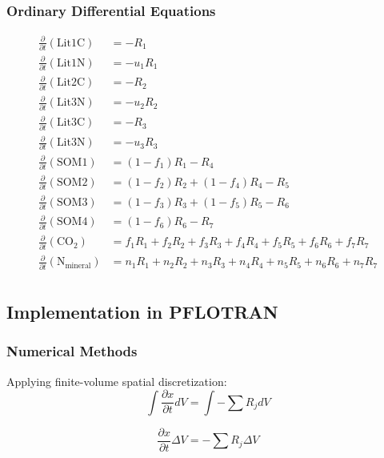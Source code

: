 \documentclass[12pt, a4paper]{article}
\begin{document}
\subsubsection{Ordinary Differential Equations}
\begin{align*}
\frac{\partial}{\partial t} \left(\text{Lit1C}\right) & =  -R_1 \\
\frac{\partial}{\partial t} \left(\text{Lit1N}\right) & =  -u_1 R_1\\
\frac{\partial}{\partial t} \left(\text{Lit2C}\right) & =  -R_2 \\
\frac{\partial}{\partial t} \left(\text{Lit3N}\right) & =  -u_2 R_2 \\
\frac{\partial}{\partial t} \left(\text{Lit3C}\right) & =  -R_3 \\
\frac{\partial}{\partial t} \left(\text{Lit3N}\right) & =  -u_3 R_3 \\
\frac{\partial}{\partial t} \left(\text{SOM1}\right) & = (1-f_1)R_1 - R_4 \\
\frac{\partial}{\partial t} \left(\text{SOM2}\right) & = (1-f_2)R_2 + (1-f_4)R_4 - R_5 \\
\frac{\partial}{\partial t} \left(\text{SOM3}\right) & = (1-f_3)R_3 + (1-f_5)R_5 - R_6 \\
\frac{\partial}{\partial t} \left(\text{SOM4}\right) & = (1-f_6)R_6 - R_7  \\
\frac{\partial}{\partial t} \left(\text{CO}_2\right) & =  f_1R_1 + f_2R_2 + f_3R_3 + f_4R_4 + f_5R_5 + f_6R_6 + f_7R_7 \\
\frac{\partial}{\partial t} \left(\text{N}_\text{mineral}\right) & = n_1R_1 + n_2R_2 + n_3R_3 +n_4R_4 +n_5R_5 +n_6R_6 + n_7R_7 \\
\end{align*}

\subsection{Implementation in PFLOTRAN}
\subsubsection{Numerical Methods}
Applying finite-volume spatial discretization:
\begin{equation}
\int \frac{\partial x}{\partial t} dV =  \int -\sum R_j dV
\end{equation}

\begin{equation}
\frac{\partial x}{\partial t} \Delta V = - \sum R_j \Delta V
\end{equation}
\end{document}

